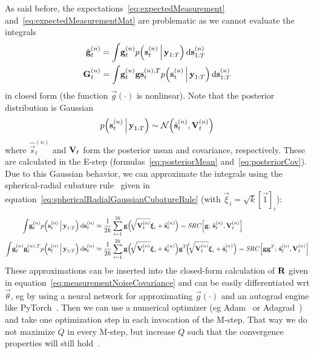 	As said before, the expectations~\eqref{eq:expectedMeasurement} and~\eqref{eq:expectedMeasurementMat} are problematic as we cannot evaluate the integrals
	\begin{align*}
		\hat{\boldsymbol{\mathrm{g}}}_t^{(n)} &= \int\! \boldsymbol{\mathrm{g}}_t^{(n)} p\Big(\boldsymbol{\mathrm{s}}_t^{(n)} \,\Big\vert\, \boldsymbol{\mathrm{y}}_{1:T}\Big) \dd{\boldsymbol{\mathrm{s}}_{1:T}^{(n)}} \\
		\boldsymbol{\mathrm{G}}_t^{(n)}       &= \int\! \boldsymbol{\mathrm{g}}_t^{(n)} \boldsymbol{\mathrm{g}}\boldsymbol{\mathrm{s}}_t^{(n), T} p\Big(\boldsymbol{\mathrm{s}}_t^{(n)} \,\Big\vert\, \boldsymbol{\mathrm{y}}_{1:T} \Big) \dd{\boldsymbol{\mathrm{s}}_{1:T}^{(n)}}
	\end{align*}
	in closed form (the function \( \vec{g}(\cdot) \) is nonlinear). Note that the posterior distribution is Gaussian
	\begin{equation*}
		p\Big(\boldsymbol{\mathrm{s}}_t^{(n)} \,\Big\vert\, \boldsymbol{\mathrm{y}}_{1:T}\Big) \sim \mathcal{N}\Big(\hat{\boldsymbol{\mathrm{s}}}_{t}^{(n)}, \boldsymbol{\mathrm{V}}_t^{(n)}\Big)
	\end{equation*}
	where \( \hat{\vec{s}}_{t}^{(n)} \) and \( \boldsymbol{\mathrm{V}}_{t} \) form the posterior mean and covariance, respectively. These are calculated in the E-step (formulas~\eqref{eq:posteriorMean} and~\eqref{eq:posteriorCov}). Due to this Gaussian behavior, we can approximate the integrals using the spherical-radial cubature rule~\cite{solinCubatureIntegrationMethods2010} given in equation~\eqref{eq:sphericalRadialGaussianCubatureRule} (with \( \vec{\xi}_i = \sqrt{k} [\vec{1}]_i \)):
	\begin{align}
		\int\! \boldsymbol{\mathrm{g}}_t^{(n)} p\Big(\boldsymbol{\mathrm{s}}_t^{(n)} \,\Big\vert\, \boldsymbol{\mathrm{y}}_{1:T}\Big) \dd{\boldsymbol{\mathrm{s}}_t^{(n)}}
			&\approx \frac{1}{2k} \sum_{i = 1}^{2k} \boldsymbol{\mathrm{g}}\Big(\!\sqrt{\boldsymbol{\mathrm{V}}_t^{(n)}} \boldsymbol{\mathrm{\xi}}_i + \hat{\boldsymbol{\mathrm{s}}}_t^{(n)}\Big) = \mathit{SRC}\Big[\boldsymbol{\mathrm{g}};\, \hat{\boldsymbol{\mathrm{s}}}_t^{(n)}, \boldsymbol{\mathrm{V}}_t^{(n)}\Big]  \label{eq:lgsCubatureG} \\
		\int\! \boldsymbol{\mathrm{g}}_t^{(n)} \boldsymbol{\mathrm{g}}_t^{(n), T} p\Big(\boldsymbol{\mathrm{s}}_t^{(n)} \,\Big\vert\, \boldsymbol{\mathrm{y}}_{1:T} \Big) \dd{\boldsymbol{\mathrm{s}}_t^{(n)}}
			&\approx \frac{1}{2k} \sum_{i = 1}^{2k} \boldsymbol{\mathrm{g}}\Big(\!\sqrt{\boldsymbol{\mathrm{V}}_t^{(n)}} \boldsymbol{\mathrm{\xi}}_i + \hat{\boldsymbol{\mathrm{s}}}_t^{(n)}\Big) \boldsymbol{\mathrm{g}}^T\!\Big(\!\sqrt{\boldsymbol{\mathrm{V}}_t^{(n)}} \boldsymbol{\mathrm{\xi}}_i + \hat{\boldsymbol{\mathrm{s}}}_t^{(n)}\Big) = \mathit{SRC}\Big[\boldsymbol{\mathrm{g}} \boldsymbol{\mathrm{g}}^T;\, \hat{\boldsymbol{\mathrm{s}}}_t^{(n)}, \boldsymbol{\mathrm{V}}_t^{(n)}\Big]  \label{eq:lgsCubatureGG}
	\end{align}
	These approximations can be inserted into the closed-form calculation of \(\boldsymbol{\mathrm{R}}\) given in equation~\eqref{eq:measurementNoiseCovariance} and can be easily differentiated \ac{wrt} \(\vec{\theta}\), \ac{eg} by using a neural network for approximating \(\vec{g}(\cdot)\) and an autograd engine like PyTorch~\cite{paszkePyTorchImperativeStyle2019}. Then we can use a numerical optimizer (\ac{eg} Adam~\cite{kingmaAdamMethodStochastic2017} or Adagrad~\cite{duchiAdaptiveSubgradientMethods2011}) and take one optimization step in each invocation of the M-step. That way we do not maximize \(Q\) in every M-step, but increase \(Q\) such that the convergence properties will still hold~\cite{moonExpectationmaximizationAlgorithm1996}.

